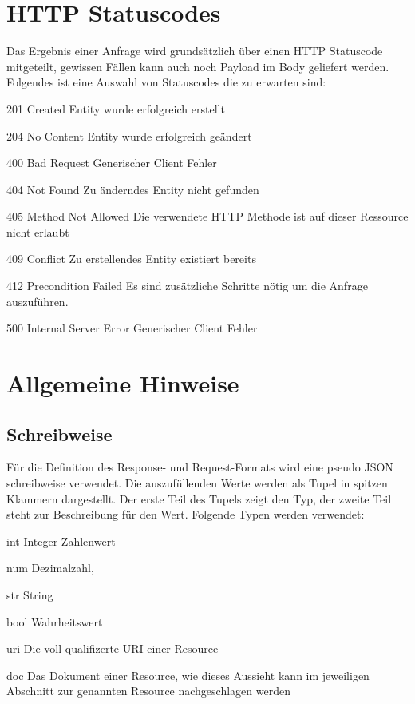 \documentclass[10pt,a4paper]{scrartcl}
\begin{document}
\pagebreak
\section{HTTP Statuscodes}
Das Ergebnis einer Anfrage wird grundsätzlich über einen HTTP Statuscode mitgeteilt, gewissen Fällen
kann auch noch Payload im Body geliefert werden. Folgendes ist eine Auswahl von Statuscodes die zu
erwarten sind:
\begin{description*}
	\item[201 Created] Entity wurde erfolgreich erstellt
	\item[204 No Content] Entity wurde erfolgreich geändert
	\item[400 Bad Request] Generischer Client Fehler
	\item[404 Not Found] Zu änderndes Entity nicht gefunden
	\item[405 Method Not Allowed] Die verwendete HTTP Methode ist auf dieser Ressource nicht erlaubt
	\item[409 Conflict] Zu erstellendes Entity existiert bereits
	\item[412 Precondition Failed] Es sind zusätzliche Schritte nötig um die Anfrage auszuführen.
	\item[500 Internal Server Error] Generischer Client Fehler
\end{description*}

\pagebreak
\section{Allgemeine Hinweise}

\subsection{Schreibweise}
Für die Definition des Response- und Request-Formats wird eine pseudo JSON schreibweise verwendet. Die
auszufüllenden Werte werden als Tupel in spitzen Klammern dargestellt. Der erste Teil des Tupels zeigt 
den Typ, der zweite Teil steht zur Beschreibung für den Wert. Folgende Typen werden verwendet:
\begin{description*}
    \item[int] Integer Zahlenwert
    \item[num] Dezimalzahl, 
    \item[str] String
    \item[bool] Wahrheitswert
    \item[uri] Die voll qualifizerte URI einer Resource
    \item[doc] Das Dokument einer Resource, wie dieses Aussieht kann im jeweiligen Abschnitt zur genannten Resource nachgeschlagen werden
\end{description*}
\end{document}
